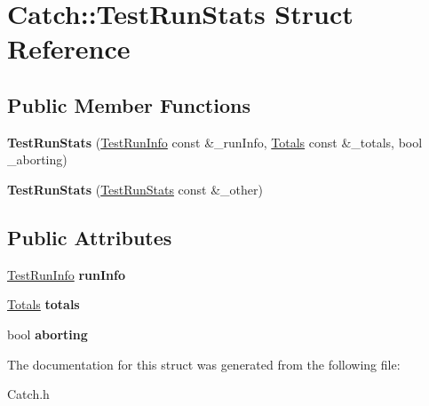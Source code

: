 \hypertarget{struct_catch_1_1_test_run_stats}{\section{Catch\-:\-:Test\-Run\-Stats Struct Reference}
\label{struct_catch_1_1_test_run_stats}
}
\subsection*{Public Member Functions}
\begin{DoxyCompactItemize}
\item 
\hypertarget{struct_catch_1_1_test_run_stats_a3a9fc8c8bed1a73a340a909f5a8577fe}{{\bfseries Test\-Run\-Stats} (\hyperlink{struct_catch_1_1_test_run_info}{Test\-Run\-Info} const \&\-\_\-run\-Info, \hyperlink{struct_catch_1_1_totals}{Totals} const \&\-\_\-totals, bool \-\_\-aborting)}\label{struct_catch_1_1_test_run_stats_a3a9fc8c8bed1a73a340a909f5a8577fe}

\item 
\hypertarget{struct_catch_1_1_test_run_stats_a62725661b161c79da2239d62d94fe20d}{{\bfseries Test\-Run\-Stats} (\hyperlink{struct_catch_1_1_test_run_stats}{Test\-Run\-Stats} const \&\-\_\-other)}\label{struct_catch_1_1_test_run_stats_a62725661b161c79da2239d62d94fe20d}

\end{DoxyCompactItemize}
\subsection*{Public Attributes}
\begin{DoxyCompactItemize}
\item 
\hypertarget{struct_catch_1_1_test_run_stats_afc5a9d3cfd9b44a260f1def9c59d7f19}{\hyperlink{struct_catch_1_1_test_run_info}{Test\-Run\-Info} {\bfseries run\-Info}}\label{struct_catch_1_1_test_run_stats_afc5a9d3cfd9b44a260f1def9c59d7f19}

\item 
\hypertarget{struct_catch_1_1_test_run_stats_a4b5828873ebb7ea7c324503e2be1f985}{\hyperlink{struct_catch_1_1_totals}{Totals} {\bfseries totals}}\label{struct_catch_1_1_test_run_stats_a4b5828873ebb7ea7c324503e2be1f985}

\item 
\hypertarget{struct_catch_1_1_test_run_stats_a5782d67fe76b34f8fd5d476eb3eb2be7}{bool {\bfseries aborting}}\label{struct_catch_1_1_test_run_stats_a5782d67fe76b34f8fd5d476eb3eb2be7}

\end{DoxyCompactItemize}


The documentation for this struct was generated from the following file\-:\begin{DoxyCompactItemize}
\item 
Catch.\-h\end{DoxyCompactItemize}
